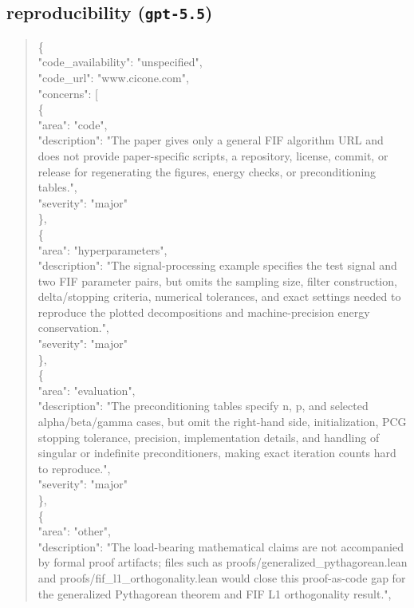 \documentclass[11pt]{article}
\begin{document}
\subsection*{reproducibility (\texttt{gpt-5.5})}
\begin{quote}\small\ttfamily\raggedright
\{\\
  "code\_availability": "unspecified",\\
  "code\_url": "www.cicone.com",\\
  "concerns": [\\
    \{\\
      "area": "code",\\
      "description": "The paper gives only a general FIF algorithm URL and does not provide paper-specific scripts, a repository, license, commit, or release for regenerating the figures, energy checks, or preconditioning tables.",\\
      "severity": "major"\\
    \},\\
    \{\\
      "area": "hyperparameters",\\
      "description": "The signal-processing example specifies the test signal and two FIF parameter pairs, but omits the sampling size, filter construction, delta/stopping criteria, numerical tolerances, and exact settings needed to reproduce the plotted decompositions and machine-precision energy conservation.",\\
      "severity": "major"\\
    \},\\
    \{\\
      "area": "evaluation",\\
      "description": "The preconditioning tables specify n, p, and selected alpha/beta/gamma cases, but omit the right-hand side, initialization, PCG stopping tolerance, precision, implementation details, and handling of singular or indefinite preconditioners, making exact iteration counts hard to reproduce.",\\
      "severity": "major"\\
    \},\\
    \{\\
      "area": "other",\\
      "description": "The load-bearing mathematical claims are not accompanied by formal proof artifacts; files such as proofs/generalized\_pythagorean.lean and proofs/fif\_l1\_orthogonality.lean would close this proof-as-code gap for the generalized Pythagorean theorem and FIF L1 orthogonality result.",\\

\end{quote}
\end{document}
